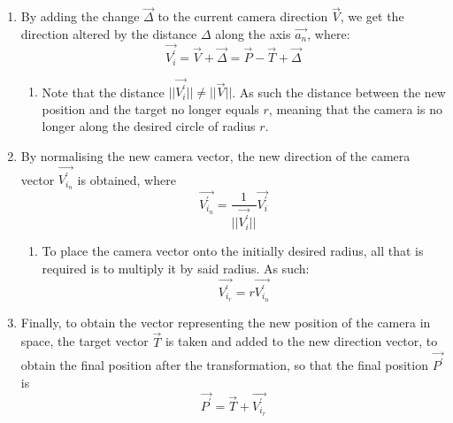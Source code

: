 \begin{enumerate}
\begin{enumerate}
\begin{equation}
            \vec{\Delta} = \Delta\vec{a_n}
        \end{equation}
    \end{enumerate}
    \item By adding the change $\vec{\Delta}$ to the current camera direction $\vec{V}$, we get the direction altered by the distance $\Delta$ along the axis $\vec{a_n}$, where:
    \begin{equation}
        \vec{V^\prime_i} = \vec{V} + \vec{\Delta} = \vec{P} - \vec{T} + \vec{\Delta}
    \end{equation}
    \begin{enumerate}
        \item Note that the distance $||\vec{V^\prime_i}|| \neq ||\vec{V}||$. As such the distance between the new position and the target no longer equals $r$, meaning that the camera is no longer along the desired circle of radius $r$.
    \end{enumerate}
    \item By normalising the new camera vector, the new direction of the camera vector $\vec{V^\prime_{i_n}}$ is obtained, where
    \begin{equation}
        \vec{V^\prime_{i_n}} = \frac{1}{||\vec{V^\prime_i}||}\vec{V^\prime_i}
    \end{equation}
    \begin{enumerate}
        \item To place the camera vector onto the initially desired radius, all that is required is to multiply it by said radius. As such:
        \begin{equation}
            \vec{V^\prime_{i_r}} = r\vec{V^\prime_{i_n}}
        \end{equation}
    \end{enumerate}
    \item Finally, to obtain the vector representing the new position of the camera in space, the target vector $\vec{T}$ is taken and added to the new direction vector, to obtain the final position after the transformation, so that the final position $\vec{P^\prime}$ is
    \begin{equation}
        \vec{P^\prime} = \vec{T} + \vec{V^\prime_{i_r}}
    \end{equation}
\end{enumerate}

